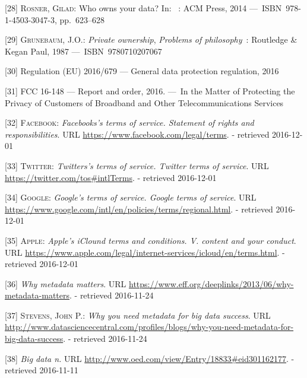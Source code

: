 \documentclass[12pt,english,a4paper,titlepage,cleardoublepage=empty,dottedtoc]{report}
\begin{document}
\hypertarget{ref-paper_2014_who-owns-yours-data}{}
{[}28{]} \textsc{Rosner, Gilad}: Who owns your data? In: ~: ACM Press,
2014 ---~ISBN~978-1-4503-3047-3, pp.~623--628

\hypertarget{ref-book_1987_private-ownership_definition}{}
{[}29{]} \textsc{Grunebaum, J.O.}: \emph{Private ownership},
\emph{Problems of philosophy}~: Routledge \& Kegan Paul, 1987
---~ISBN~9780710207067

\hypertarget{ref-regulation_2016_eu_general-data-protection-regulation_ownership}{}
{[}30{]} Regulation (EU) 2016/679 --- General data protection
regulation, 2016

\hypertarget{ref-rules_2016_fcc_to-protect-broadband-consumer-privacy_ownership}{}
{[}31{]} FCC 16-148 --- Report and order, 2016. ---~In the Matter of
Protecting the Privacy of Customers of Broadband and Other
Telecommunications Services

\hypertarget{ref-web_2016_facebook_terms-of-service}{}
{[}32{]} \textsc{Facebook}: \emph{Facebooks's terms of service.
Statement of rights and responsibilities}. URL
\url{https://www.facebook.com/legal/terms}. - retrieved 2016-12-01

\hypertarget{ref-web_2016_twitter_terms-of-service}{}
{[}33{]} \textsc{Twitter}: \emph{Twitters's terms of service. Twitter
terms of service}. URL \url{https://twitter.com/tos\#intlTerms}. -
retrieved 2016-12-01

\hypertarget{ref-web_2016_google_terms-of-service}{}
{[}34{]} \textsc{Google}: \emph{Google's terms of service. Google terms
of service}. URL
\url{https://www.google.com/intl/en/policies/terms/regional.html}. -
retrieved 2016-12-01

\hypertarget{ref-web_2016_apple-icloud_terms-of-service}{}
{[}35{]} \textsc{Apple}: \emph{Apple's iClound terms and conditions. V.
content and your conduct}. URL
\url{https://www.apple.com/legal/internet-services/icloud/en/terms.html}.
- retrieved 2016-12-01

\hypertarget{ref-web_2013_why-metadata-matters}{}
{[}36{]} \emph{Why metadata matters}. URL
\url{https://www.eff.org/deeplinks/2013/06/why-metadata-matters}. -
retrieved 2016-11-24

\hypertarget{ref-web_2016_why-you-need-metadata-for-big-data-to-success}{}
{[}37{]} \textsc{Stevens, John P.}: \emph{Why you need metadata for big
data success}. URL
\url{http://www.datasciencecentral.com/profiles/blogs/why-you-need-metadata-for-big-data-success}.
- retrieved 2016-11-24

\hypertarget{ref-web_2016_oxford_definition_big-data}{}
{[}38{]} \emph{Big data n.} URL
\url{http://www.oed.com/view/Entry/18833\#eid301162177}. - retrieved
2016-11-11
\end{document}
